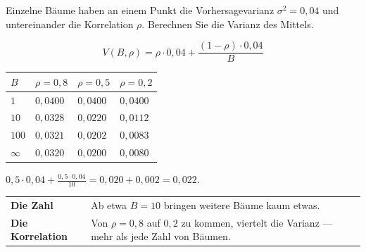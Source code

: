 \begin{aufgabe}
Einzelne Bäume haben an einem Punkt die Vorhersagevarianz $\sigma^{2} = 0{,}04$ und untereinander die Korrelation $\rho$. Berechnen Sie die Varianz des Mittels.

\loesung
{}
\[ V(B,\rho) = \rho\cdot0{,}04 + \frac{(1-\rho)\cdot0{,}04}{B} \]

\begin{center}
{\small
\renewcommand{\arraystretch}{1.48}
\begin{tabular}{@{}P{1.4cm}P{1.8cm}P{1.8cm}P{1.8cm}@{}}
\toprule
$B$ & $\rho = 0{,}8$ & $\rho = 0{,}5$ & $\rho = 0{,}2$\\
\midrule
$1$ & $0{,}0400$ & $0{,}0400$ & $0{,}0400$\\
$10$ & $0{,}0328$ & $0{,}0220$ & $0{,}0112$\\
$100$ & $0{,}0321$ & $0{,}0202$ & $0{,}0083$\\
$\infty$ & $0{,}0320$ & $0{,}0200$ & $0{,}0080$\\
\bottomrule
\end{tabular}}
\end{center}

 $0{,}5\cdot0{,}04 + \frac{0{,}5\cdot0{,}04}{10} = 0{,}020 + 0{,}002 = 0{,}022$.

\begin{center}
{\small
\renewcommand{\arraystretch}{1.5}
\begin{tabular}{@{}P{2.4cm}P{6.2cm}@{}}
\toprule
\textbf{Die Zahl} & Ab etwa $B = 10$ bringen weitere Bäume kaum etwas.\\
\textbf{Die Korrelation} & Von $\rho = 0{,}8$ auf $0{,}2$ zu kommen, viertelt die Varianz --- mehr als jede Zahl von Bäumen.\\
\bottomrule
\end{tabular}}
\end{center}

\begin{center}
\begin{minipage}{0.88\textwidth}
\end{minipage}
\end{center}
\end{aufgabe}

